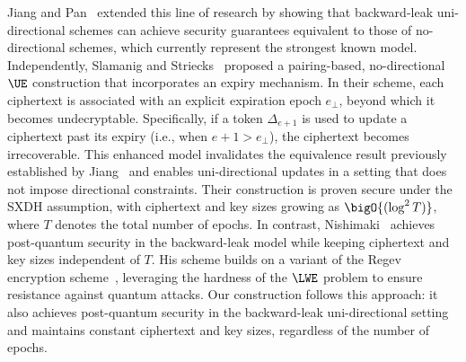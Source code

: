 \documentclass{fundam}
\begin{document}
Jiang and Pan~\cite{jiang2023backward} extended this line of research by showing that backward-leak uni-directional schemes can achieve security guarantees equivalent to those of no-directional schemes, which currently represent the strongest known model. Independently, Slamanig and Striecks~\cite{SS21} proposed a pairing-based, no-directional $\UE$ construction that incorporates an expiry mechanism. In their scheme, each ciphertext is associated with an explicit expiration epoch $e_\perp$, beyond which it becomes undecryptable. Specifically, if a token $\Delta_{e+1}$ is used to update a ciphertext past its expiry (i.e., when $e + 1 > e_\perp$), the ciphertext becomes irrecoverable. This enhanced model invalidates the equivalence result previously established by Jiang~\cite{jiang2020} and enables uni-directional updates in a setting that does not impose directional constraints. Their construction is proven secure under the SXDH assumption, with ciphertext and key sizes growing as $\bigO{(\log^2 T)}$, where $T$ denotes the total number of epochs. In contrast, Nishimaki~\cite{nishimaki2022direction} achieves post-quantum security in the backward-leak model while keeping ciphertext and key sizes independent of $T$. His scheme builds on a variant of the Regev encryption scheme~\cite{regev2009lattices}, leveraging the hardness of the $\LWE$ problem to ensure resistance against quantum attacks. Our construction follows this approach: it also achieves post-quantum security in the backward-leak uni-directional setting and maintains constant ciphertext and key sizes, regardless of the number of epochs.




\end{document}
